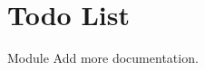 \chapter{Todo List}
\hypertarget{todo}{}\label{todo}

\begin{DoxyRefList}
\item[Module \doxylink{group__coroutine}{coroutine} ]\label{todo__todo000001}%
%
Add more documentation. 
\end{DoxyRefList}
